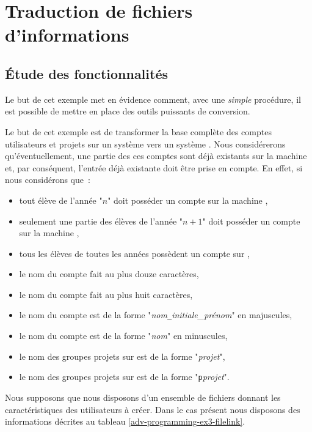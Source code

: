 \section{\label{adv-programming-ex3}Traduction de fichiers d'informations}

\subsection{\label{adv-programming-ex3-fcts}{\'E}tude des fonctionnalit{\'e}s}

Le but de cet exemple met en {\'e}vidence comment, avec une {\sl simple} proc{\'e}dure, il
est possible de mettre en place des outils puissants de conversion.

Le but de cet exemple est de transformer la base compl{\`e}te des comptes utilisateurs
et projets sur un syst{\`e}me {\OpenVMS} vers un syst{\`e}me {\Unix}. Nous consid{\'e}rerons
qu'{\'e}ventuellement, une partie des ces comptes sont d{\'e}j{\`a} existants sur la machine
{\Unix} et, par cons{\'e}quent, l'entr{\'e}e d{\'e}j{\`a} existante doit {\^e}tre prise en
compte. En effet, si nous consid{\'e}rons que~:
\begin{itemize}
	\item	tout {\'e}l{\`e}ve de l'ann{\'e}e "$n$" doit poss{\'e}der un compte
			sur la machine {\Unix},
	\item	seulement une partie des {\'e}l{\`e}ves de l'ann{\'e}e "$n+1$" doit
			poss{\'e}der un compte sur la machine {\Unix},
	\item	tous les {\'e}l{\`e}ves de toutes les ann{\'e}es poss{\`e}dent un compte sur
			{\OpenVMS},
	\item	le nom du compte {\OpenVMS} fait au plus douze caract{\`e}res,
	\item	le nom du compte {\Unix} fait au plus huit caract{\`e}res,
	\item	le nom du compte {\OpenVMS} est de la forme
			"{\sl nom}{\tt \_}{\sl initiale\_pr{\'e}nom}" en majuscules,
	\item	le nom du compte {\Unix} est de la forme "{\sl nom}" en minuscules,
	\item	le nom des groupes projets sur {\OpenVMS} est de la forme
			"{\sl projet}",
	\item	le nom des groupes projets sur {\Unix} est de la forme
			"{\tt p}{\sl projet}".
\end{itemize}

Nous supposons que nous disposons d'un ensemble de fichiers donnant les
caract{\'e}ristiques des utilisateurs {\`a} cr{\'e}er. Dans le cas
pr{\'e}sent nous disposons des informations d{\'e}crites au tableau
\ref{adv-programming-ex3-filelink}.

